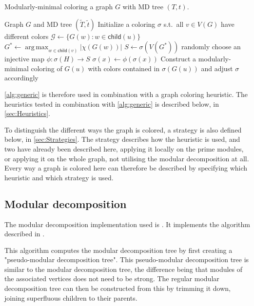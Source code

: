 \documentclass[a4paper]{article}
\newcommand{\child}{\mathsf{child}}
\DeclareMathOperator*{\argmax}{arg\,max}
\newcommand{\T}{\widetilde{T}}
\renewcommand{\t}{\widetilde{t}}
\begin{document}
\begin{algorithm}[H]
  \caption{Modularly-minimal coloring a graph $G$ with MD tree $(T,t)$.}
  \label{alg:generic}
  \begin{algorithmic}[1]
    \REQUIRE Graph $G$ and MD tree $(\T,\t)$
    \STATE Initialize a coloring $\sigma$ s.t.\ all $v \in V(G)$
           have different colors
          \STATE $\mathcal{G} \leftarrow \{G(w)\colon w\in\child(u)\}$ 
          \STATE $G^* \leftarrow \argmax_{w\in\child(v)} |\chi(G(w))|$
          \STATE $S \leftarrow \sigma(V(G^*))$ 
             \STATE randomly choose an injective map $\phi:\sigma(H)\to S$
                \STATE $\sigma(x)\leftarrow \phi(\sigma(x))$  
             \ENDFOR
          \ENDFOR
          \STATE Construct a modularly-minimal coloring of $G(u)$
              with colors contained in $\sigma(G(u))$
              and adjust $\sigma$ accordingly 
       \ENDIF
    \ENDFOR
  \end{algorithmic}
\end{algorithm}

\autoref{alg:generic} is therefore used in combination with a graph coloring
heuristic. The heuristics tested in combination with \autoref{alg:generic} is
described below, in \autoref{sec:Heuristics}.

To distinguish the different ways the graph is colored, a strategy is also
defined below, in \autoref{sec:Strategies}.  The strategy describes how the
heuristic is used, and two have already been described here, applying it locally
on the prime modules, or applying it on the whole graph, not utilising the
modular decomposition at all. Every way a graph is colored here can therefore be
described by specifying which heuristic and which strategy is used.

\subsection{Modular decomposition}

The modular decomposition implementation used is \cite{Anna}. It implements the
algorithm described in \cite{MDAlgorithm}. 

This algorithm computes the modular decomposition tree by first creating a
"pseudo-modular decomposition tree". This pseudo-modular decomposition tree is
similar to the modular decomposition tree, the difference being that modules of the
associated vertices does not need to be strong.  The regular modular
decomposition tree can then be constructed from this by trimming it down,
joining superfluous children to their parents.
\end{document}
